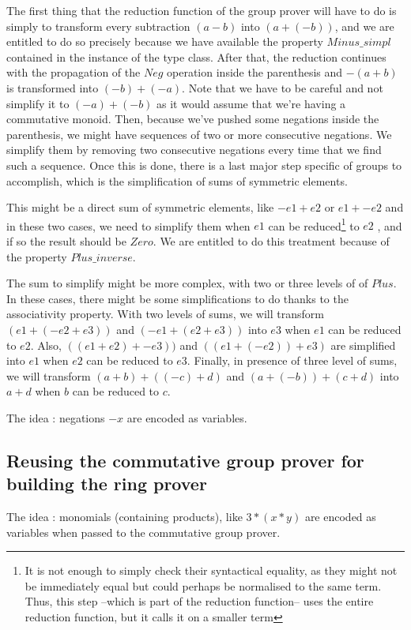 The first thing that the reduction function of the group prover will have to do is simply to transform every subtraction $(a-b)$ into $(a + (-b))$, and we are entitled to do so precisely because we have available the property $Minus\_simpl$ contained in the instance of the type class.
After that, the reduction continues with the propagation of the $Neg$ operation inside the parenthesis and $-(a+b)$ is transformed into $(-b) + (-a)$. Note that we have to be careful and not simplify it to $(-a) + (-b)$ as it would assume that we're having a commutative monoid.
Then, because we've pushed some negations inside the parenthesis, we might have sequences of two or more consecutive negations. We simplify them by removing two consecutive negations every time that we find such a sequence. Once this is done, there is a last major step specific of groups to accomplish, which is the simplification of sums of symmetric elements. 

This might be a direct sum of symmetric elements, like $-e1 + e2$ or $e1 + -e2$ and in these two cases, we need to simplify them when $e1$ can be reduced\footnote{It is not enough to simply check their syntactical equality, as they might not be immediately equal but could perhaps be normalised to the same term. Thus, this step --which is part of the reduction function-- uses the entire reduction function, but it calls it on a smaller term} to $e2$ , and if so the result should be $Zero$. We are entitled to do this treatment because of the property $Plus\_inverse$.

The sum to simplify might be more complex, with two or three levels of of $Plus$. In these cases, there might be some simplifications to do thanks to the associativity property. With two levels of sums, we will transform $(e1 + (-e2 + e3))$ and $(-e1 + (e2+e3))$ into $e3$ when $e1$ can be reduced to $e2$. Also, $((e1+e2) + -e3))$ and $((e1+(-e2)) + e3)$ are simplified into $e1$ when $e2$ can be reduced to $e3$. Finally, in presence of three level of sums, we will transform $(a+b) + ((-c)+d)$ and $(a+(-b)) + (c+d)$ into $a+d$ when $b$ can be reduced to $c$.


The idea : negations $-x$ are encoded as variables.

\subsection {Reusing the commutative group prover for building the ring prover}

The idea : monomials (containing products), like $3*(x*y)$ are encoded as variables when passed to the commutative group prover. 
